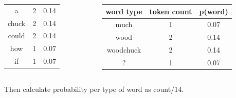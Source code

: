 \documentclass{beamer}
\begin{document}
{{\begin{columns}[T]
\begin{column}{0.5\textwidth}
\begin{center}
\begin{tabular}{c|c|c}
            \hline
            a & 2 & 0.14\\
            chuck & 2 & 0.14 \\
            could & 2 & 0.14 \\
            how & 1 & 0.07\\
            if & 1 & 0.07 \\
          \end{tabular}
        \end{center}
      \end{column}
      \begin{column}{0.5\textwidth}
        \begin{center}
          \small
          \begin{tabular}{c|c|c}
            word type & token count & \alert{p(word)} \\
            \hline
            much & 1 & 0.07\\
            wood & 2 & 0.14 \\
            woodchuck  &2 & 0.14 \\
            ? & 1 & 0.07 \\
          \end{tabular}
        \end{center}
      \end{column}
  \end{columns}
  Then calculate probability per \alert{type} of word as count/14.
  }


}
\end{document}
